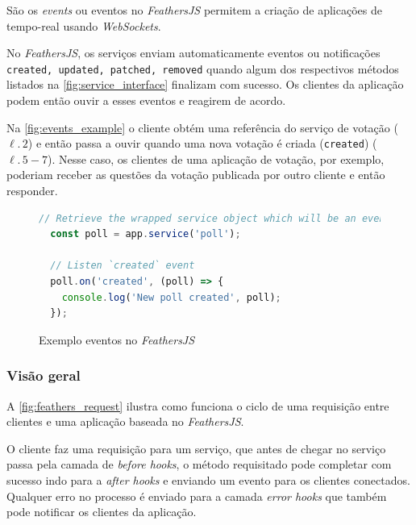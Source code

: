 São os \textit{events} ou eventos no \textit{\textit{FeathersJS}} permitem
a criação de aplicações de tempo-real usando \textit{WebSockets}.

No \textit{\textit{FeathersJS}}, os serviços enviam automaticamente eventos ou notificações
\texttt{created, updated, patched, removed} quando algum dos respectivos métodos listados
na \autoref{fig:service_interface} finalizam com sucesso.
Os clientes da aplicação podem então ouvir a esses eventos e reagirem de acordo.

Na \autoref{fig:events_example} o cliente obtém uma referência do serviço
de votação ($\ell.\,2$) e então passa a ouvir quando uma nova votação é criada (\texttt{created}) ($\ell.\,5-7$).
Nesse caso, os clientes de uma aplicação de votação, por exemplo, poderiam
receber as questões da votação publicada por outro cliente e então responder.

\begin{figure}[h]
\begin{lstlisting}[language=JavaScript]
  // Retrieve the wrapped service object which will be an event emitter
  const poll = app.service('poll');

  // Listen `created` event
  poll.on('created', (poll) => {
    console.log('New poll created', poll);
  });
\end{lstlisting}
\caption{Exemplo eventos no \textit{\textit{FeathersJS}}}
\label{fig:events_example}
\end{figure}

\subsubsection{Visão geral}

A \autoref{fig:feathers_request} ilustra como funciona o ciclo de uma requisição
entre clientes e uma aplicação baseada no \textit{FeathersJS}.

O cliente faz uma requisição para um serviço, que antes de chegar no serviço passa
pela camada de \textit{before hooks}, o método requisitado pode completar com sucesso indo para a
\textit{after hooks} e enviando um evento para os clientes conectados. Qualquer erro no processo
é enviado para a camada \textit{error hooks} que também pode notificar os clientes da aplicação.

